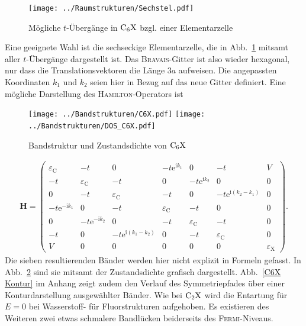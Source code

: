 \documentclass[a4paper, 10pt, twoside, openany]{book} %
\def \I {\mathrm i}
\def \E {\mathrm e}
\def \vec {\boldsymbol}
\def \eC {\varepsilon_\mathrm{C}}
\def \eX {\varepsilon_\mathrm{X}}
\begin{document}
	\begin{figure}
		\centering
		\texttt{[image: ../Raumstrukturen/Sechstel.pdf]}
		\caption{Mögliche $t$-Übergänge in $\rm C_6X$ bzgl. einer Elementarzelle}
		\label{Uebergaenge C6X}
	\end{figure}
	Eine geeignete Wahl ist die sechseckige Elementarzelle, die in Abb.~\ref{Uebergaenge C6X} mitsamt aller $t$-Übergänge dargestellt ist. Das \textsc{Bravais}-Gitter ist also wieder hexagonal, nur dass die Translationsvektoren die Länge $3 a$ aufweisen. Die angepassten Koordinaten $k_1$ und $k_2$ seien hier in Bezug auf das neue Gitter definiert. Eine mögliche Darstellung des \textsc{Hamilton}-Operators ist
	\begin{figure}
		\texttt{[image: ../Bandstrukturen/C6X.pdf]}
		\hfill
		\texttt{[image: ../Bandstrukturen/DOS\_C6X.pdf]}
		\caption{Bandstruktur und Zustandsdichte von $\rm C_6X$}
		\label{C6X}
	\end{figure}
	\begin{align*}
		\vec H =
		\begin{pmatrix}
	        \eC             & -t              &  0                     & -t \E^{\I k_1} &  0             & -t                     &  V \\
	        -t              & \eC             & -t                     &  0             & -t \E^{\I k_2} &  0                     &  0 \\
	         0              & -t              & \eC                    & -t             &  0             & -t \E^{\I (k_2 - k_1)} &  0 \\
	        -t \E^{-\I k_1} &  0              & -t                     & \eC            & -t             &  0                     &  0 \\
	         0              & -t \E^{-\I k_2} &  0                     & -t             & \eC            & -t                     &  0 \\
	        -t              &  0              & -t \E^{\I (k_1 - k_2)} &  0             & -t             & \eC                    &  0 \\
	         V              &  0              &  0                     &  0             &  0             &  0                     & \eX
		\end{pmatrix}.
	\end{align*}
	Die sieben resultierenden Bänder werden hier nicht explizit in Formeln gefasst. In Abb.~\ref{C6X} sind sie mitsamt der Zustandsdichte grafisch dargestellt. Abb.~\ref{C6X Kontur} im Anhang zeigt zudem den Verlauf des Symmetriepfades über einer Konturdarstellung ausgewählter Bänder. Wie bei $\rm C_2X$ wird die Entartung für $E = 0$ bei Wasserstoff- für Fluorstrukturen aufgehoben. Es existieren des Weiteren zwei etwas schmalere Bandlücken beiderseits des \textsc{Fermi}-Niveaus.
	
\end{document}
